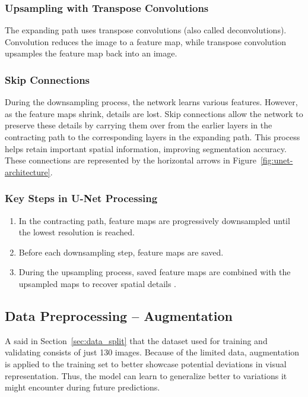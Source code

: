 \subsubsection{Upsampling with Transpose Convolutions}

The expanding path uses transpose convolutions (also called deconvolutions). Convolution reduces the image to a feature map, while transpose convolution upsamples the feature map back into an image.

\subsubsection{Skip Connections}

During the downsampling process, the network learns various features. However, as the feature maps shrink, details are lost. Skip connections allow the network to preserve these details by carrying them over from the earlier layers in the contracting path to the corresponding layers in the expanding path. This process helps retain important spatial information, improving segmentation accuracy. These connections are represented by the horizontal arrows in Figure~\ref{fig:unet-architecture}.
\subsubsection{Key Steps in U-Net Processing}
\begin{enumerate}
    \item In the contracting path, feature maps are progressively downsampled until the lowest resolution is reached.
    \item Before each downsampling step, feature maps are saved.
    \item During the upsampling process, saved feature maps are combined with the upsampled maps to recover spatial details \cite{ronneberger_u-net_2015}.
\end{enumerate}


\subsection{Data Preprocessing – Augmentation} \label{sec:aug}
A said in Section~\ref{sec:data_split} that the dataset used for training and validating consists of just 130 images. Because of the limited data, augmentation is applied to the training set to better showcase potential deviations in visual representation. Thus, the model can learn to generalize better to variations it might encounter during future predictions. 

